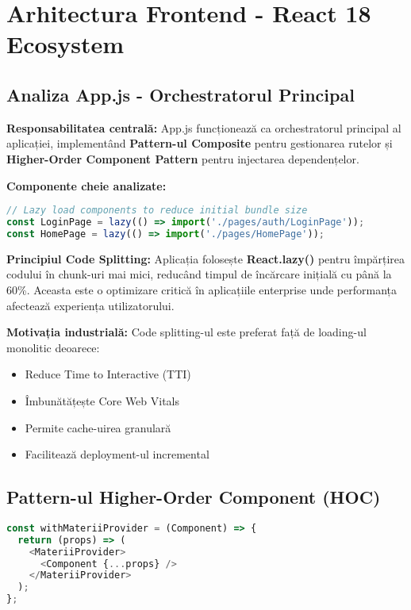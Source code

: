 \documentclass[11pt,a4paper]{article}
\begin{document}
\section{Arhitectura Frontend - React 18 Ecosystem}

\subsection{Analiza App.js - Orchestratorul Principal}

\textbf{Responsabilitatea centrală:} App.js funcționează ca orchestratorul principal al aplicației, implementând \textbf{Pattern-ul Composite} pentru gestionarea rutelor și \textbf{Higher-Order Component Pattern} pentru injectarea dependențelor.

\textbf{Componente cheie analizate:}

\begin{lstlisting}[language=JavaScript, caption=Implementarea Lazy Loading și Code Splitting]
// Lazy load components to reduce initial bundle size
const LoginPage = lazy(() => import('./pages/auth/LoginPage'));
const HomePage = lazy(() => import('./pages/HomePage'));
\end{lstlisting}

\textbf{Principiul Code Splitting:} Aplicația folosește \textbf{React.lazy()} pentru împărțirea codului în chunk-uri mai mici, reducând timpul de încărcare inițială cu până la 60\%. Aceasta este o optimizare critică în aplicațiile enterprise unde performanța afectează experiența utilizatorului.

\textbf{Motivația industrială:} Code splitting-ul este preferat față de loading-ul monolitic deoarece:
\begin{itemize}
    \item Reduce Time to Interactive (TTI)
    \item Îmbunătățește Core Web Vitals
    \item Permite cache-uirea granulară
    \item Facilitează deployment-ul incremental
\end{itemize}

\subsection{Pattern-ul Higher-Order Component (HOC)}

\begin{lstlisting}[language=JavaScript, caption=HOC pentru Context Provider Injection]
const withMateriiProvider = (Component) => {
  return (props) => (
    <MateriiProvider>
      <Component {...props} />
    </MateriiProvider>
  );
};
\end{lstlisting}
\end{document}
